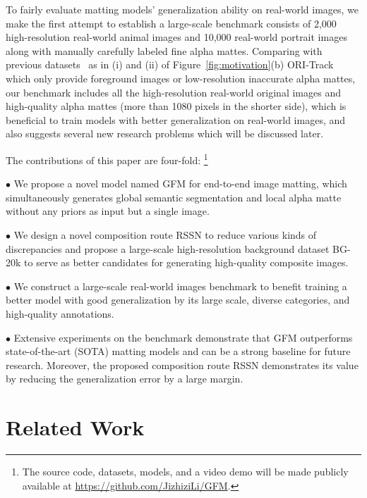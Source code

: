 \documentclass[twocolumn]{svjour3}
\begin{document}
To fairly evaluate matting models' generalization ability on real-world images, we make the first attempt to establish a large-scale benchmark consists of 2,000 high-resolution real-world animal images and 10,000 real-world portrait images along with manually carefully labeled fine alpha mattes. Comparing with previous datasets~\citep{xu2017deep,Qiao_2020_CVPR,shen2016deep} as in (i) and (ii) of Figure~\ref{fig:motivation}(b) ORI-Track which only provide foreground images or low-resolution inaccurate alpha mattes, our benchmark includes all the high-resolution real-world original images and high-quality alpha mattes (more than 1080 pixels in the shorter side), which is beneficial to train models with better generalization on real-world images, and also suggests several new research problems which will be discussed later.

The contributions of this paper are four-fold:
\footnote{The source code, datasets, models, and a video demo will be made publicly available at \url{https://github.com/JizhiziLi/GFM}.}

$\bullet$ We propose a novel model named GFM for end-to-end image matting, which simultaneously generates global semantic segmentation and local alpha matte without any priors as input but a single image.

$\bullet$ We design a novel composition route RSSN to reduce various kinds of discrepancies and propose a large-scale high-resolution background dataset BG-20k to serve as better candidates for generating high-quality composite images.


$\bullet$ We construct a large-scale real-world images benchmark to benefit training a better model with good generalization by its large scale, diverse categories, and high-quality annotations.

$\bullet$ Extensive experiments on the benchmark demonstrate that GFM outperforms state-of-the-art (SOTA) matting models and can be a strong baseline for future research. Moreover, the proposed composition route RSSN demonstrates its value by reducing the generalization error by a large margin.







\section{Related Work}
\end{document}

